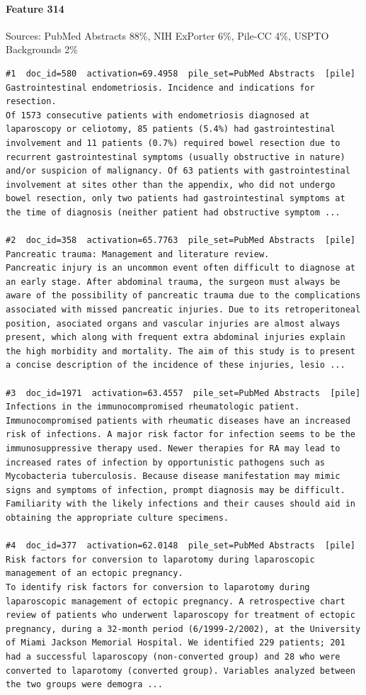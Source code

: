 \paragraph*{Feature 314} Sources: PubMed Abstracts 88\%, NIH ExPorter 6\%, Pile-CC 4\%, USPTO Backgrounds 2\%

\begin{verbatim}
#1  doc_id=580  activation=69.4958  pile_set=PubMed Abstracts  [pile]
Gastrointestinal endometriosis. Incidence and indications for resection.
Of 1573 consecutive patients with endometriosis diagnosed at laparoscopy or celiotomy, 85 patients (5.4%) had gastrointestinal involvement and 11 patients (0.7%) required bowel resection due to recurrent gastrointestinal symptoms (usually obstructive in nature) and/or suspicion of malignancy. Of 63 patients with gastrointestinal involvement at sites other than the appendix, who did not undergo bowel resection, only two patients had gastrointestinal symptoms at the time of diagnosis (neither patient had obstructive symptom ...

#2  doc_id=358  activation=65.7763  pile_set=PubMed Abstracts  [pile]
Pancreatic trauma: Management and literature review.
Pancreatic injury is an uncommon event often difficult to diagnose at an early stage. After abdominal trauma, the surgeon must always be aware of the possibility of pancreatic trauma due to the complications associated with missed pancreatic injuries. Due to its retroperitoneal position, asociated organs and vascular injuries are almost always present, which along with frequent extra abdominal injuries explain the high morbidity and mortality. The aim of this study is to present a concise description of the incidence of these injuries, lesio ...

#3  doc_id=1971  activation=63.4557  pile_set=PubMed Abstracts  [pile]
Infections in the immunocompromised rheumatologic patient.
Immunocompromised patients with rheumatic diseases have an increased risk of infections. A major risk factor for infection seems to be the immunosuppressive therapy used. Newer therapies for RA may lead to increased rates of infection by opportunistic pathogens such as Mycobacteria tuberculosis. Because disease manifestation may mimic signs and symptoms of infection, prompt diagnosis may be difficult. Familiarity with the likely infections and their causes should aid in obtaining the appropriate culture specimens.

#4  doc_id=377  activation=62.0148  pile_set=PubMed Abstracts  [pile]
Risk factors for conversion to laparotomy during laparoscopic management of an ectopic pregnancy.
To identify risk factors for conversion to laparotomy during laparoscopic management of ectopic pregnancy. A retrospective chart review of patients who underwent laparoscopy for treatment of ectopic pregnancy, during a 32-month period (6/1999-2/2002), at the University of Miami Jackson Memorial Hospital. We identified 229 patients; 201 had a successful laparoscopy (non-converted group) and 28 who were converted to laparotomy (converted group). Variables analyzed between the two groups were demogra ...


\end{verbatim}

